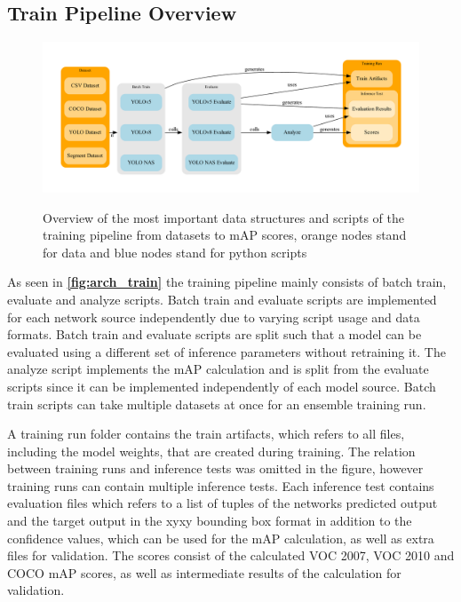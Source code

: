 \documentclass[10pt]{book}
\newcommand{\figureref}[1]{\textbf{\autoref{#1}}}
\begin{document}
\subsection{Train Pipeline Overview}

\begin{figure}
  \caption{Overview of the most important data structures and scripts of the training pipeline from datasets to \ac{mAP} scores, orange nodes stand for data and blue nodes stand for python scripts}
  \includegraphics[width=\textwidth]{graph/arch_train}
  \label{fig:arch_train}
\end{figure}

As seen in \figureref{fig:arch_train} the training pipeline mainly consists of batch train, evaluate and analyze scripts. Batch train and evaluate scripts are implemented for each network source independently due to varying script usage and data formats. Batch train and evaluate scripts are split such that a model can be evaluated using a different set of inference parameters without retraining it. The analyze script implements the \ac{mAP} calculation and is split from the evaluate scripts since it can be implemented independently of each model source. Batch train scripts can take multiple datasets at once for an ensemble training run.

A training run folder contains the train artifacts, which refers to all files, including the model weights, that are created during training. The relation between training runs and inference tests was omitted in the figure, however training runs can contain multiple inference tests. Each inference test contains evaluation files which refers to a list of tuples of the networks predicted output and the target output in the xyxy bounding box format in addition to the confidence values, which can be used for the \ac{mAP} calculation, as well as extra files for validation. The scores consist of the calculated VOC 2007, VOC 2010 and COCO \ac{mAP} scores, as well as intermediate results of the calculation for validation.
\end{document}
